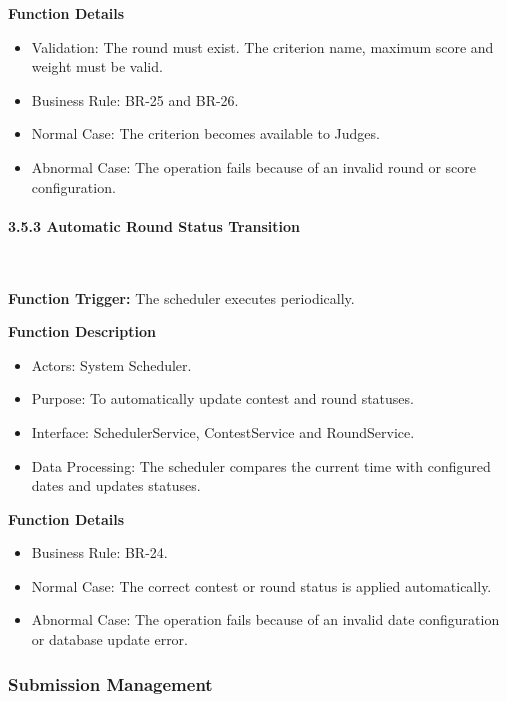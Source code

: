 \textbf{Function Details}
\begin{itemize}[leftmargin=1.5em, nosep]
    \item Validation: The round must exist. The criterion name, maximum score and weight must be valid.
    \item Business Rule: BR-25 and BR-26.
    \item Normal Case: The criterion becomes available to Judges.
    \item Abnormal Case: The operation fails because of an invalid round or score configuration.
\end{itemize}

\paragraph*{3.5.3 Automatic Round Status Transition}\leavevmode\\[-0.5em]
\label{par:automatic-round-status-transition}

\textbf{Function Trigger:} The scheduler executes periodically.

\textbf{Function Description}
\begin{itemize}[leftmargin=1.5em, nosep]
    \item Actors: System Scheduler.
    \item Purpose: To automatically update contest and round statuses.
    \item Interface: SchedulerService, ContestService and RoundService.
    \item Data Processing: The scheduler compares the current time with configured dates and updates statuses.
\end{itemize}

\textbf{Function Details}
\begin{itemize}[leftmargin=1.5em, nosep]
    \item Business Rule: BR-24.
    \item Normal Case: The correct contest or round status is applied automatically.
    \item Abnormal Case: The operation fails because of an invalid date configuration or database update error.
\end{itemize}

\subsubsection{Submission Management}
\label{subsubsec:submission-management}

